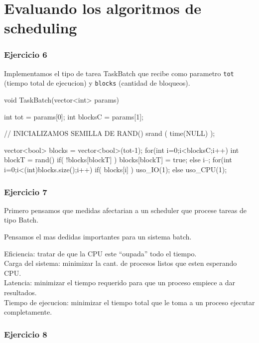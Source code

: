 \part{Evaluando los algoritmos de scheduling}

\section{Ejercicio 6}

Implementamos el tipo de tarea TaskBatch que recibe como parametro \verb|tot| (tiempo total de ejecucion) y \verb|blocks| (cantidad de bloqueos).

\begin{framed}
\begin{verbatimtab}
void TaskBatch(vector<int> params) {
	int tot = params[0];
	int blocksC = params[1];
	
	// INICIALIZAMOS SEMILLA DE RAND()
	srand ( time(NULL) );
	
	vector<bool> blocks = vector<bool>(tot-1);
	for(int i=0;i<blocksC;i++) {
		int blockT = rand()%
		if( !blocks[blockT] )
			blocks[blockT] = true;
		else
			i--;
	}
	for(int i=0;i<(int)blocks.size();i++) {
		if( blocks[i] )
			uso_IO(1);
		else
			uso_CPU(1);
	}
}
\end{verbatimtab}
\end{framed}

\section{Ejercicio 7}

Primero pensamos que medidas afectarian a un scheduler que procese tareas de tipo Batch.

Pensamos el mas dedidas importantes para un sistema batch.

Eficiencia: tratar de que la CPU este ``oupada'' todo el tiempo.\\
Carga del sistema: minimizar la cant. de procesos listos que esten esperando CPU.\\
Latencia: minimizar el tiempo requerido para que un proceso empiece a dar resultados.\\
Tiempo de ejecucion: minimizar el tiempo total que le toma a un proceso ejecutar completamente.

\section{Ejercicio 8}

